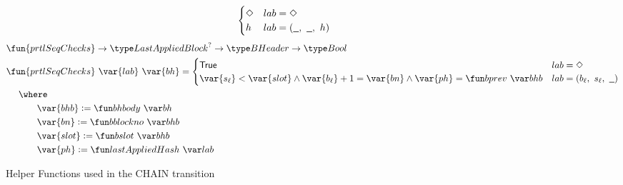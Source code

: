 \begin{figure}[htb]
\begin{align*}
\begin{cases}
          \Nothing & lab = \Nothing \\
          h & lab = (\wcard,~\wcard,~h) \\
        \end{cases}
  \end{align*}
  \begin{align*}
      & \fun{prtlSeqChecks} \to \LastAppliedBlock^? \to \BHeader \to \Bool \\
      & \fun{prtlSeqChecks}~\var{lab}~\var{bh} =
        \begin{cases}
          \mathsf{True}
          &
          lab = \Nothing
          \\
          \var{s_\ell} < \var{slot}
          \land \var{b_\ell} + 1 = \var{bn}
          \land \var{ph} = \bprev{bhb}
          &
          lab = (b_\ell,~s_\ell,~\wcard) \\
        \end{cases} \\
      & ~~~~\where \\
      & ~~~~~~~~~~\var{bhb} \leteq \bhbody{bh} \\
      & ~~~~~~~~~~\var{bn} \leteq \bblockno{bhb} \\
      & ~~~~~~~~~~\var{slot} \leteq \bslot{bhb} \\
      & ~~~~~~~~~~\var{ph} \leteq \lastAppliedHash{lab} \\
  \end{align*}

  \caption{Helper Functions used in the CHAIN transition}
  \label{fig:funcs:chain-helper}
\end{figure}


